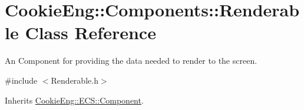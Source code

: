 \hypertarget{class_cookie_eng_1_1_components_1_1_renderable}{}\section{Cookie\+Eng\+:\+:Components\+:\+:Renderable Class Reference}
\label{class_cookie_eng_1_1_components_1_1_renderable}


An Component for providing the data needed to render to the screen.  




{\ttfamily \#include $<$Renderable.\+h$>$}



Inherits \hyperlink{class_cookie_eng_1_1_e_c_s_1_1_component}{Cookie\+Eng\+::\+E\+C\+S\+::\+Component}.


